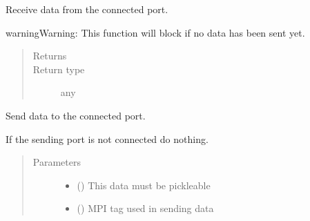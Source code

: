 \documentclass[letterpaper,10pt,openany,oneside,english]{sphinxmanual}
\begin{document}
\begin{fulllineitems}
\begin{fulllineitems}
\begin{quote}
\begin{description}
\end{description}\end{quote}

\end{fulllineitems}


\begin{fulllineitems}
\label{\detokenize{src_rst/port:port.Port.recv}}
Receive data from the connected port.

\begin{sphinxadmonition}{warning}{Warning:}
This function will block if no data has been sent yet.
\end{sphinxadmonition}
\begin{quote}\begin{description}
\item[{Returns}] \leavevmode
{}

\item[{Return type}] \leavevmode
any

\end{description}\end{quote}

\end{fulllineitems}


\begin{fulllineitems}
\label{\detokenize{src_rst/port:port.Port.send}}
Send data to the connected port.

If the sending port is not connected do nothing.
\begin{quote}\begin{description}
\item[{Parameters}] \leavevmode\begin{itemize}
\item {} 
 () \textendash{} This data must be pickleable

\item {} 
 (\sphinxstyleliteralemphasis{\sphinxupquote{, }}) \textendash{} MPI tag used in sending data

\end{itemize}

\end{description}\end{quote}

\end{fulllineitems}


\end{fulllineitems}
\end{document}

